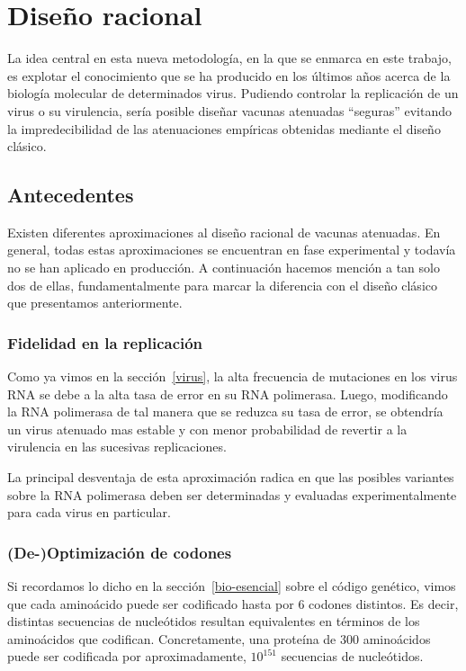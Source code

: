 \section{Dise\~no racional}

La idea central en esta nueva metodolog\'ia, en la que se enmarca en este
trabajo, es explotar el conocimiento que se ha producido en los \'ultimos
a\~nos acerca de la biolog\'ia molecular de determinados virus. Pudiendo
controlar la replicaci\'on de un virus o su virulencia, ser\'ia posible
dise\~nar vacunas atenuadas ``seguras'' evitando la impredecibilidad de las
atenuaciones emp\'iricas obtenidas mediante el dise\~no cl\'asico.

\subsection{Antecedentes}

Existen diferentes aproximaciones al dise\~no racional de vacunas
atenuadas\cite{Lauring10}. En general, todas estas aproximaciones se encuentran
en fase experimental y todav\'ia no se han aplicado en producci\'on. A
continuaci\'on hacemos menci\'on a tan solo dos de ellas, fundamentalmente para
marcar la diferencia con el dise\~no cl\'asico que presentamos anteriormente.

\subsubsection{Fidelidad en la replicaci\'on\cite{Vignuzzi08}} 

Como ya vimos en la secci\'on~\ref{virus}, la alta frecuencia de mutaciones en
los virus \ac{RNA} se debe a la alta tasa de error en su \ac{RNA} polimerasa.
Luego, modificando la \ac{RNA} polimerasa de tal manera que se reduzca su tasa
de error, se obtendr\'ia un virus atenuado mas estable y con menor probabilidad
de revertir a la virulencia en las sucesivas replicaciones. 

La principal desventaja de esta aproximaci\'on radica en que las
posibles variantes sobre la \ac{RNA} polimerasa deben ser determinadas y
evaluadas experimentalmente para cada virus en particular.

\subsubsection{(De-)Optimizaci\'on de codones\cite{Mueller10, Coleman08}} 

Si recordamos lo dicho en la secci\'on~\ref{bio-esencial} sobre el c\'odigo
gen\'etico, vimos que cada amino\'acido puede ser codificado hasta por 6
codones distintos. Es decir, distintas secuencias de nucle\'otidos resultan
equivalentes en t\'erminos de los amino\'acidos que codifican. Concretamente,
una prote\'ina de 300 amino\'acidos puede ser codificada por aproximadamente, 
$10^{151}$ secuencias de nucle\'otidos. 

